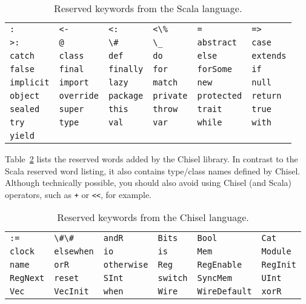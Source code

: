 \documentclass[%
    10pt,
    headinclude, footexclude,
    openright, %
    notitlepage,
    cleardoubleempty,
    headsepline,
    pointlessnumbers,
    bibtotoc, idxtotoc,
    ]{scrbook}
\newcommand{\code}[1]{{\lstinline[basicstyle=\small\ttfamily]{#1}}}
\begin{document}
\begin{table}[h]
\centering
\begin{tabular}{llllll}
\code{:}  & \code{<-}  & \code{<:}  & \code{<\%}  & \code{=}  & \code{=>} \\
\code{>:}  & \code{@}  & \code{\#}  & \code{\_}  & \code{abstract}  & \code{case} \\
\code{catch}  & \code{class}  & \code{def}  & \code{do}  & \code{else}  & \code{extends} \\
\code{false}  & \code{final}  & \code{finally}  & \code{for}  & \code{forSome}  & \code{if} \\
\code{implicit}  & \code{import}  & \code{lazy}  & \code{match}  & \code{new}  & \code{null} \\
\code{object}  & \code{override}  & \code{package}  & \code{private}  & \code{protected}  & \code{return} \\
\code{sealed}  & \code{super}  & \code{this}  & \code{throw}  & \code{trait}  & \code{true} \\
\code{try}  & \code{type}  & \code{val}  & \code{var}  & \code{while}  & \code{with} \\
\code{yield}  & \\
\end{tabular}
\caption{Reserved keywords from the Scala language.}
\label{tab:reserved:scala}
\end{table}

Table~\ref{tab:reserved:chisel} lists the reserved words added by the Chisel library.
In contrast to the Scala reserved word listing, it also contains type/class names defined by Chisel.
Although technically possible, you should also avoid using Chisel (and Scala) operators, such as
\code{+} or \code{<<}, for example. %

\begin{table}[h]
\centering
\begin{tabular}{llllll}
\code{:=}  & \code{\#\#}  & \code{andR}  & \code{Bits}  & \code{Bool}  & \code{Cat} \\
\code{clock}  & \code{elsewhen}  & \code{io}  & \code{is}  & \code{Mem}  & \code{Module} \\
\code{name}  & \code{orR}  & \code{otherwise}  & \code{Reg}  & \code{RegEnable}  & \code{RegInit} \\
\code{RegNext}  & \code{reset}  & \code{SInt}  & \code{switch}  & \code{SyncMem}  & \code{UInt} \\
\code{Vec}  & \code{VecInit}  & \code{when}  & \code{Wire}  & \code{WireDefault}  & \code{xorR} \\
\end{tabular}
\caption{Reserved keywords from the Chisel language.}
\label{tab:reserved:chisel}
\end{table}
\end{document}
